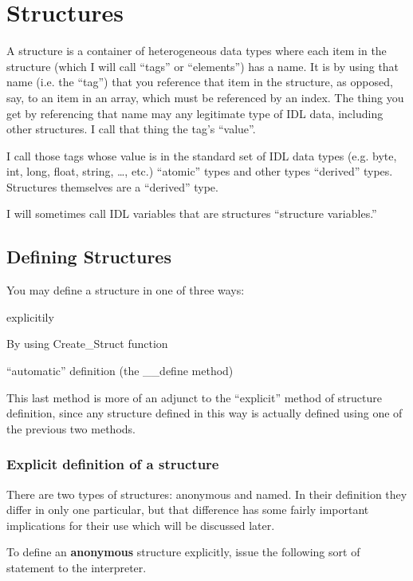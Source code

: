 \section{Structures}\label{sec:Structures}

A structure is a container of heterogeneous data types where each item
in the structure (which I will call ``tags'' or ``elements'') has a
name.  It is by using that name (i.e. the ``tag'') that you reference
that item in the structure, as opposed, say, to an item in an array,
which must be referenced by an index. The thing you get by referencing
that name may any legitimate type of IDL data, including other
structures. I call that thing the tag's ``value''.

I call those tags whose value is in the standard set of IDL data types
(e.g.  byte, int, long, float, string, \ldots, etc.) ``atomic'' types
and other types ``derived'' types. Structures themselves are a
``derived'' type. 


I will sometimes call IDL variables that are structures ``structure
variables.''

\subsection{Defining Structures}

You may define a structure in one of three ways:

\bi 
  \item {explicitily}
  \item {By using Create\_Struct function}
  \item {``automatic'' definition (the \_\_define method)}
    
    This last method is more of an adjunct to the ``explicit'' method
    of structure definition, since any structure defined in this way
    is actually defined using one of the previous two
    methods.

  \ei

\subsubsection{Explicit definition of a structure}


There are two types of structures: anonymous and named. In their
definition they differ in only one particular, but that difference has
some fairly important implications for their use which will be
discussed later.

To define an \textbf{anonymous} structure explicitly, issue the
following sort of statement to the interpreter.

